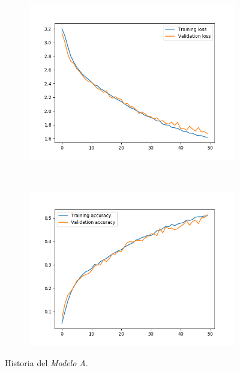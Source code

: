 \documentclass[11pt,a4paper]{article}
\begin{document}
\begin{figure}[H]
  \centering
  \begin{subfigure}{.5\textwidth}
    \includegraphics[scale=0.38]{img/deep1-aug-loss.png}
    \label{fig:deep1-aug-loss}
  \end{subfigure}%
  ~ \quad
  \begin{subfigure}{.5\textwidth}
    \includegraphics[scale=0.38]{img/deep1-aug-acc.png}
    \label{fig:deep1-aug-acc}
  \end{subfigure}
  \caption{Historia del \textit{Modelo A}.}
  \label{fig:deep1-aug}
\end{figure}
\end{document}
